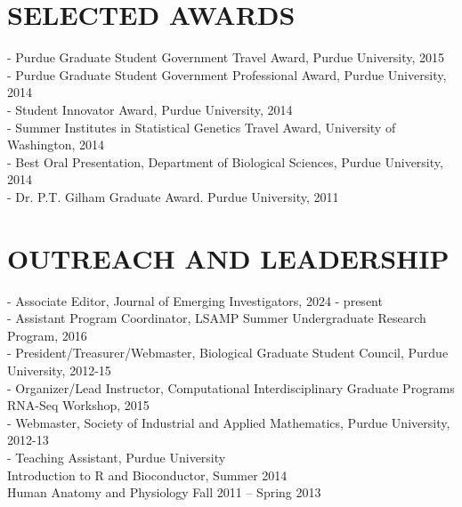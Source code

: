 \documentclass[11pt,letterpaper,sans]{moderncv}        %
\begin{document}
{\section{SELECTED AWARDS}
\begin{minipage}{\maincolumnwidth}%
	\small{
	- Purdue Graduate Student Government Travel Award, Purdue University, 2015\\
          - Purdue Graduate Student Government Professional Award, Purdue University, 2014\\
          - Student Innovator Award, Purdue University, 2014\\
          - Summer Institutes in Statistical Genetics Travel Award, University of Washington, 2014\\
	- Best Oral Presentation, Department of Biological Sciences, Purdue University, 2014\\
	 - Dr. P.T. Gilham Graduate Award. Purdue University, 2011
	}%
\end{minipage}%
 
\section{OUTREACH AND LEADERSHIP}
\begin{minipage}{\maincolumnwidth}%
	\small{
	 - Associate Editor, Journal of Emerging Investigators, 2024 - present\\
          - Assistant Program Coordinator, LSAMP Summer Undergraduate Research Program, 2016\\
          - President/Treasurer/Webmaster, Biological Graduate Student Council, Purdue University, 2012-15\\
          - Organizer/Lead Instructor, Computational Interdisciplinary Graduate Programs RNA-Seq Workshop, 2015\\
          - Webmaster, Society of Industrial and Applied Mathematics, Purdue University, 2012-13\\
	- Teaching Assistant, Purdue University\\
		\tab \quad  \bullet Introduction to R and Bioconductor, Summer 2014\\ 
		\tab \quad \bullet  Human Anatomy and Physiology Fall 2011 – Spring 2013
	}%
\end{minipage}%

}
\nocite{*}

\end{document}
